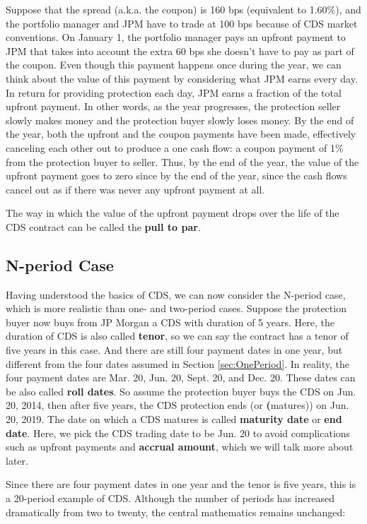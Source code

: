 \documentclass[article]{jss}
\begin{document}
Suppose that the spread (a.k.a. the coupon) is 160 bps (equivalent to 1.60\%), and the portfolio manager and JPM have to trade at 100 bps because of CDS market conventions. On January 1, the portfolio manager pays an upfront payment to JPM that takes into account the extra 60 bps she doesn't have to pay as part of the coupon. Even though this payment happens once during the year, we can think about the value of this payment by considering what JPM earns every day. In return for providing protection each day, JPM earns a fraction of the total upfront payment. In other words, as the year progresses, the protection seller slowly makes money and the protection buyer slowly loses money. By the end of the year, both the upfront and the coupon payments have been made, effectively canceling each other out to produce a one cash flow: a coupon payment of 1\% from the protection buyer to seller. Thus, by the end of the year, the value of the upfront payment goes to zero since by the end of the year, since the cash flows cancel out as if there was never any upfront payment at all. 

The way in which the value of the upfront payment drops over the life of the CDS contract can be called the \textbf{pull to par}.

\subsection{N-period Case}
\label{sec:nPeriodCase}

Having understood the basics of CDS, we can now consider the N-period case, which is more realistic than one- and two-period cases. Suppose the protection buyer now buys from JP Morgan a CDS with duration of 5 years. Here, the duration of CDS is also called \textbf{tenor}, so we can say the contract has a tenor of five years in this case. And there are still four payment dates in one year, but different from the four dates assumed in Section \ref{sec:OnePeriod}. In reality, the four payment dates are Mar. 20, Jun. 20, Sept. 20, and Dec. 20. These dates can be also called \textbf{roll dates}. So assume the protection buyer buys the CDS on Jun. 20, 2014, then after five years, the CDS protection ends (or \textbf(matures)) on Jun. 20, 2019. The date on which a CDS matures is called \textbf{maturity date} or \textbf{end date}. Here, we pick the CDS trading date to be Jun. 20 to avoid complications such as upfront payments and \textbf{accrual amount}, which we will talk more about later.

Since there are four payment dates in one year and the tenor is five years, this is a 20-period example of CDS.
Although the number of periods has increased dramatically from two to twenty, the central mathematics remains unchanged:
\end{document}
